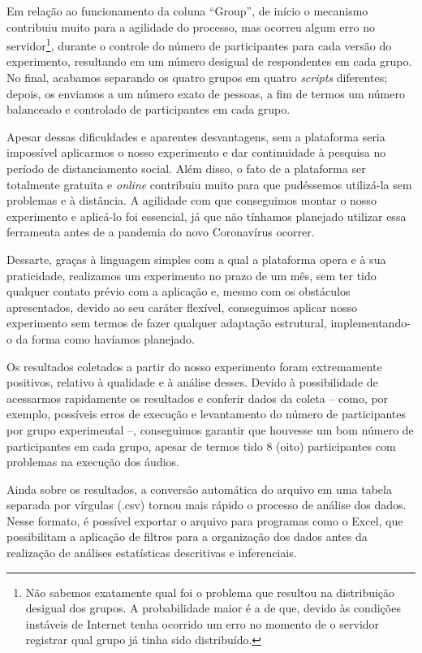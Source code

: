 \documentclass{textolivre}
\begin{document}
Em relação ao funcionamento da coluna “Group”, de início o mecanismo contribuiu muito para a agilidade do processo, mas ocorreu algum erro no servidor\footnote{Não sabemos exatamente qual foi o problema que resultou na distribuição desigual dos grupos. A probabilidade maior é a de que, devido às condições instáveis de Internet tenha ocorrido um erro no momento de o servidor registrar qual grupo já tinha sido distribuído.}, durante o controle do número de participantes para cada versão do experimento, resultando em um número desigual de respondentes em cada grupo. No final, acabamos separando os quatro grupos em quatro \emph{scripts} diferentes; depois, os enviamos a um número exato de pessoas, a fim de termos um número balanceado e controlado de participantes em cada grupo.

Apesar dessas dificuldades e aparentes desvantagens, sem a plataforma seria impossível aplicarmos o nosso experimento e dar continuidade à pesquisa no período de distanciamento social. Além disso, o fato de a plataforma ser totalmente gratuita e \textit{online} contribuiu muito para que pudéssemos utilizá-la sem problemas e à distância. A agilidade com que conseguimos montar o nosso experimento e aplicá-lo foi essencial, já que não tínhamos planejado utilizar essa ferramenta antes de a pandemia do novo Coronavírus ocorrer.

Dessarte, graças à linguagem simples com a qual a plataforma opera e à sua praticidade, realizamos um experimento no prazo de um mês, sem ter tido qualquer contato prévio com a aplicação e, mesmo com os obstáculos apresentados, devido ao seu caráter flexível, conseguimos aplicar nosso experimento sem termos de fazer qualquer adaptação estrutural, implementando-o da forma como havíamos planejado.
	
Os resultados coletados a partir do nosso experimento foram extremamente positivos, relativo à qualidade e à análise desses. Devido à possibilidade de acessarmos rapidamente os resultados e conferir dados da coleta – como, por exemplo, possíveis erros de execução e levantamento do número de participantes por grupo experimental –, conseguimos garantir que houvesse um bom número de participantes em cada grupo, apesar de termos tido 8 (oito) participantes com problemas na execução dos áudios.

Ainda sobre os resultados, a conversão automática do arquivo em uma tabela separada por vírgulas (.csv) tornou mais rápido o processo de análise dos dados. Nesse formato, é possível exportar o arquivo para programas como o Excel, que possibilitam a aplicação de filtros para a organização dos dados antes da realização de análises estatísticas descritivas e inferenciais.
\end{document}
